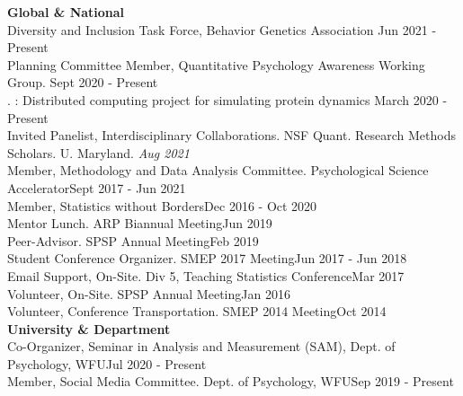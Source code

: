 {\large \textbf{Global \& National}}\smallskip\\
Diversity and Inclusion Task Force, Behavior Genetics Association \hfill{Jun 2021 - Present}\smallskip\\
Planning Committee Member, Quantitative Psychology Awareness Working Group. \hfill{Sept 2020 - Present}\smallskip\\%
. : Distributed computing project for simulating protein dynamics \hfill{March 2020 - Present}\smallskip\\
%
Invited Panelist, {\small Interdisciplinary Collaborations. NSF Quant. Research Methods Scholars. U. Maryland.} \hfill{\textit{Aug 2021}}\smallskip\\
Member, Methodology and Data Analysis Committee. Psychological Science Accelerator\hfill{Sept 2017 - Jun 2021}\smallskip\\
Member, Statistics without Borders\hfill{Dec 2016 - Oct 2020}\smallskip\\
%
Mentor Lunch. ARP Biannual Meeting\hfill{Jun 2019}\smallskip\\
Peer-Advisor. SPSP Annual Meeting\hfill{Feb 2019}\smallskip\\
Student Conference Organizer. SMEP 2017 Meeting\hfill{Jun 2017 - Jun 2018}\smallskip\\
Email Support, On-Site. Div 5, Teaching Statistics Conference\hfill{Mar 2017}\smallskip\\
Volunteer, On-Site. SPSP Annual Meeting\hfill{Jan 2016}\smallskip\\
Volunteer, Conference Transportation. SMEP 2014 Meeting\hfill{Oct 2014}\medskip\\
%
%
{\large \textbf{University \& Department}}\smallskip\\
Co-Organizer, Seminar in Analysis and Measurement (SAM), Dept. of Psychology, WFU\hfill {Jul 2020 - Present}\smallskip\\
Member, Social Media Committee. Dept. of Psychology, WFU\hfill {Sep 2019 - Present}\smallskip\\
